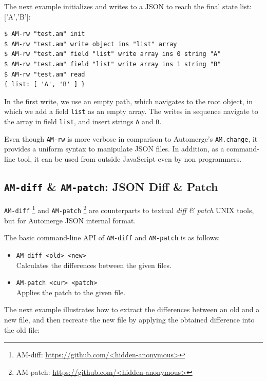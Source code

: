 \documentclass[12pt]{article}
\newcommand{\code}[1]  {\texttt{\footnotesize{#1}}}
\begin{document}
The next example initializes and writes to a JSON to reach the final state
{list: ['A','B']}:

\begin{verbatim}
$ AM-rw "test.am" init
$ AM-rw "test.am" write object ins "list" array
$ AM-rw "test.am" field "list" write array ins 0 string "A"
$ AM-rw "test.am" field "list" write array ins 1 string "B"
$ AM-rw "test.am" read
{ list: [ 'A', 'B' ] }
\end{verbatim}

In the first write, we use an empty path, which navigates to the root object,
in which we add a field \code{list} as an empty array.
The writes in sequence navigate to the array in field \code{list}, and insert
strings \code{A} and \code{B}.

Even though \code{AM-rw} is more verbose in comparison to Automerge's
\code{AM.change}, it provides a uniform syntax to manipulate JSON files.
In addition, as a command-line tool, it can be used from outside JavaScript
even by non programmers.

\subsection{\code{AM-diff} \& \code{AM-patch}: JSON Diff \& Patch}

\code{AM-diff}%
    \footnote{AM-diff: \url{https://github.com/<hidden-anonymous>}}
and \code{AM-patch}%
    \footnote{AM-patch: \url{https://github.com/<hidden-anonymous>}}
are counterparts to textual \emph{diff \& patch} UNIX tools, but for
Automerge JSON internal format.

The basic command-line API of \code{AM-diff} and \code{AM-patch} is as follows:

\begin{itemize}
\item \code{AM-diff <old> <new>} \\
    Calculates the differences between the given files.
\item \code{AM-patch <cur> <patch>} \\
    Applies the patch to the given file.
\end{itemize}

The next example illustrates how to extract the differences between an old and
a new file, and then recreate the new file by applying the obtained difference
into the old file:
\end{document}
